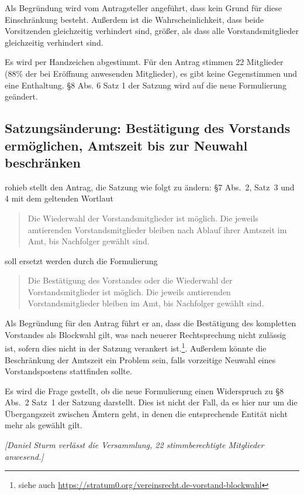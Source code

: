 \documentclass[a4paper,12pt]{scrartcl}
\begin{document}
Als Begründung wird vom Antragsteller angeführt, dass kein Grund für diese
Einschränkung besteht. Außerdem ist die Wahrscheinlichkeit, dass beide
Vorsitzenden gleichzeitig verhindert sind, größer, als dass alle
Vorstandsmitglieder gleichzeitig verhindert sind.

Es wird per Handzeichen abgestimmt. Für den Antrag stimmen 22 Mitglieder (88\%
der bei Eröffnung anwesenden Mitglieder), es gibt keine Gegenstimmen und eine
Enthaltung. §8 Abs. 6 Satz 1 der Satzung wird auf die neue Formulierung
geändert.

\subsection{Satzungsänderung: Bestätigung des Vorstands ermöglichen, Amtszeit
bis zur Neuwahl beschränken}

rohieb stellt den Antrag, die Satzung wie folgt zu ändern: §7 Abs.~2, Satz~3 und
4 mit dem geltenden Wortlaut
\begin{quote}
  Die Wiederwahl der Vorstandsmitglieder ist möglich. Die jeweils amtierenden
  Vorstandsmitglieder bleiben nach Ablauf ihrer Amtszeit im Amt, bis Nachfolger
  gewählt sind.
\end{quote}
soll ersetzt werden durch die Formulierung
\begin{quote}
  Die Bestätigung des Vorstandes oder die Wiederwahl der Vorstandsmitglieder ist
  möglich. Die jeweils amtierenden Vorstandsmitglieder bleiben im Amt, bis
  Nachfolger gewählt sind.
\end{quote}

Als Begründung für den Antrag führt er an, dass die Bestätigung des kompletten
Vorstandes als Blockwahl gilt, was nach neuerer Rechtsprechung nicht zulässig
ist, sofern dies nicht in der Satzung verankert ist.\footnote{siehe auch 
\url{https://stratum0.org/vereinsrecht.de-vorstand-blockwahl}}.
Außerdem könnte die Beschränkung der Amtszeit ein Problem sein, falls vorzeitige
Neuwahl eines Vorstandspostens stattfinden sollte.

Es wird die Frage gestellt, ob die neue Formulierung einen Widerspruch zu §8
Abs.~2 Satz~1 der Satzung darstellt. Dies ist nicht der Fall, da es hier nur um
die Übergangszeit zwischen Ämtern geht, in denen die entsprechende Entität nicht
mehr als gewählt gilt.

\emph{[Daniel Sturm verlässt die Versammlung, 22 stimmberechtigte Mitglieder
anwesend.]}
\end{document}
